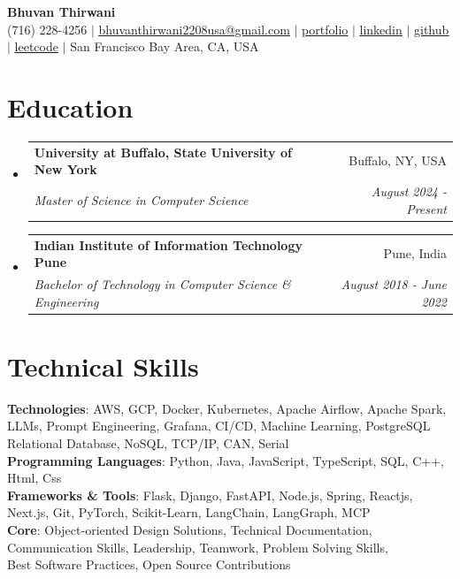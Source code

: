 \documentclass[letterpaper,10pt]{report}
\makeatletter
\newcommand{\resumeEducationSubheading}[4]{
  \vspace{-2pt}\item
    \begin{tabular*}{0.97\textwidth}[t]{l@{\extracolsep{\fill}}r}
      \textbf{#1} & #2 \\
      \textit{\small#3} & \textit{\small #4} \\
    \end{tabular*}\vspace{-7pt}
}
\newcommand{\resumeSubHeadingListStart}{\begin{itemize}[leftmargin=0.15in, label={}]}
\newcommand{\resumeSubHeadingListEnd}{\end{itemize}}
\makeatother
\begin{document}
\vspace{-50pt}
\begin{center}

    \textbf{\Huge Bhuvan Thirwani} \\ \vspace{1pt}
    (716) 228-4256 $|$ \href{mailto:bhuvanthirwani2208usa@gmail.com}{\underline{bhuvanthirwani2208usa@gmail.com}} $|$
    \href{http://portfolio.haxcodes.dev}
    {\underline{portfolio}} $|$
    \href{http://www.linkedin.com/in/dev-hax-codes}
    {\underline{linkedin}} $|$
    \href{https://github.com/bhuvanthirwani}
    {\underline{github}} $|$
    \href{http://www.leetcode.com/bhuvanthirwani}
    {\underline{leetcode}} $|$
    {San Francisco Bay Area, CA, USA}
\end{center}

\section{Education}
  \resumeSubHeadingListStart
   \resumeEducationSubheading
      {University at Buffalo, State University of New York}{Buffalo, NY, USA}
      {Master of Science in Computer Science}{August 2024 - Present}
    \resumeEducationSubheading
      {Indian Institute of Information Technology Pune}{Pune, India}
      {Bachelor of Technology in Computer Science \& Engineering}{August 2018 - June 2022}
  \resumeSubHeadingListEnd

\section{Technical Skills}
 \begin{itemize}[leftmargin=0.05in, label={}]
    \small{
        \item{
     \textbf{Technologies}{: AWS, GCP, Docker, Kubernetes, Apache Airflow, Apache Spark, LLMs, Prompt Engineering, Grafana, CI/CD, Machine Learning, PostgreSQL Relational Database, NoSQL, TCP/IP, CAN, Serial} \\ \textbf{Programming Languages}{: Python, Java, JavaScript, TypeScript, SQL, C++, Html, Css} \\ \textbf{Frameworks \& Tools}{: Flask, Django, FastAPI, Node.js, Spring, Reactjs, Next.js, Git, PyTorch, Scikit-Learn, LangChain, LangGraph, MCP} \\ \textbf{Core}{: Object-oriented Design Solutions, Technical Documentation, Communication Skills, Leadership, Teamwork, Problem Solving Skills, \\ Best Software Practices, Open Source Contributions}
    }
    }
  
 \end{itemize}
\end{document}
